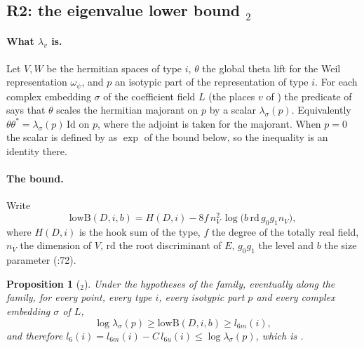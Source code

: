 \documentclass[11pt]{article}
\newtheorem{proposition}[theorem]{Proposition}
\theoremstyle{remark}
\begin{document}
\subsection{R2: the eigenvalue lower bound $_2$}\label{sec:fu4r2}

\paragraph{What $\lambda_v$ is.} Let $V,W$ be the hermitian spaces of type $i$, $\theta$ the global theta lift for the Weil representation $\omega_\psi$, and $p$ an isotypic part of the representation of type $i$. For each complex embedding $\sigma$ of the coefficient field $L$ (the places $v$ of ) the predicate  of  says that $\theta$ scales the hermitian majorant on $p$ by a scalar $\lambda_\sigma(p)$. Equivalently $\theta\theta^*=\lambda_\sigma(p)\,\mathrm{Id}$ on $p$, where the adjoint is taken for the majorant. When $p=0$ the scalar is defined by  as $\exp$ of the bound below, so the inequality is an identity there.

\paragraph{The bound.} Write
\[
\mathrm{lowB}(D,i,b)=H(D,i)-8f\,n_V^2\,\log\bigl(b\,\mathrm{rd}\,g_0g_1n_V\bigr),
\]
where $H(D,i)$ is the hook sum  of the type, $f$ the degree of the totally real field, $n_V$ the dimension of $V$, $\mathrm{rd}$ the root discriminant of $E$, $g_0g_1$ the level and $b$ the size parameter (:72).

\begin{proposition}[$_2$]\label{prop:lamlow4}
Under the hypotheses of the family, eventually along the family, for every point, every type $i$, every isotypic part $p$ and every complex embedding $\sigma$ of $L$,
\[
\log\lambda_\sigma(p)\ge\mathrm{lowB}(D,i,b)\ge l_{6m}(i),
\]
and therefore $l_6(i)=l_{6m}(i)-C\,l_{6u}(i)\le\log\lambda_\sigma(p)$, which is .
\end{proposition}
\end{document}
